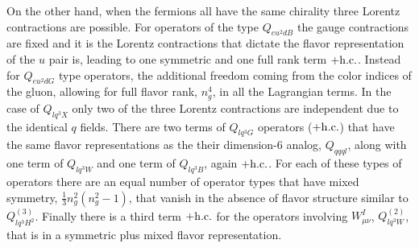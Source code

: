 \begin{enumerate}
On the other hand, when the fermions all have the same chirality three Lorentz contractions are possible.
For operators of the type $Q_{eu^2dB}$ the gauge contractions are fixed and it is the Lorentz contractions that dictate the flavor representation of the $u$ pair is, leading to one symmetric and one full rank term $+ \mathrm{h.c.}$.
Instead for $Q_{eu^2dG}$ type operators, the additional freedom coming from the color indices of the gluon, allowing for full flavor rank, $n_g^4$, in all the Lagrangian terms.
In the case of $Q_{lq^3X}$ only two of the three Lorentz contractions are independent due to the identical $q$ fields.
There are two terms of $Q_{lq^3G}$ operators ($+ \mathrm{h.c.}$) that have the same flavor representations as the their dimension-6 analog, $Q_{qqql}$, along with one term of $Q_{lq^3W}$ and one term of $Q_{lq^3B}$, again $+ \mathrm{h.c.}$.
For each of these types of operators there are an equal number of operator types that have mixed symmetry, $\tfrac{1}{3} n_g^2 (n_g^2 - 1)$, that vanish in the absence of flavor structure similar to $Q_{lq^3H^2}^{(3)}$.
Finally there is a third term $+ \mathrm{h.c.}$ for the operators involving $W_{\mu\nu}^I$, $Q_{lq^3W}^{(2)}$, that is in a symmetric plus mixed flavor representation.


\end{enumerate}
